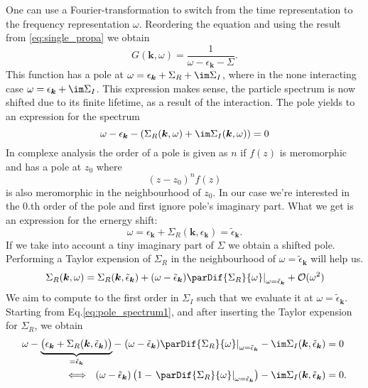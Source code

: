 \documentclass[../main.tex]{subfile}
\begin{document}
One can use a Fourier-transformation to switch from the time representation to the frequency representation $\omega$. Reordering the equation and using the result
from \ref{eq:single_propa} we obtain
\[
    G(\bm{k},\omega) = \frac{1}{\omega - \epsilon_{\bm{k}} - \Sigma}.
\]
This function has a pole at $\omega = \epsilon_{\bm{k}} + \Sigma_R + \im \Sigma_I$, where in the none interacting case $\omega = \epsilon_{\bm{k}} + \im\Sigma_I$.
This expression makes sense, the particle spectrum is now shifted due to its finite lifetime, as a result of the interaction.
The pole yields to an expression for the spectrum
\begin{equation} \label{eq:pole_spectrum1}
    \omega - \epsilon_{\bm{k}} - \left(\Sigma_R(\bm{k},\omega) + \im \Sigma_I(\bm{k},\omega)\right) = 0
\end{equation}
In complexe analysis the order of a pole is given as $n$ if $f(z)$ is meromorphic and has a pole at $z_0$ where
\[
    (z-z_0)^n f(z)
\]
is also meromorphic in the neighbourhood of $z_0$. In our case we're interested in the 0.th order of the pole and first ignore pole's imaginary part. What we get
is an expression for the ernergy shift:
\[
    \omega = \epsilon_{\bm{k}} + \Sigma_R(\bm{k}, \epsilon_{\bm{k}}) = \tilde{\epsilon}_{\bm{k}}.  
\]
If we take into account a tiny imaginary part of $\Sigma$ we obtain a shifted pole. Performing a Taylor expension of 
$\Sigma_{R}$ in the neighbourhood of $\omega = \tilde{\epsilon}_{\bm{k}}$ will help us.
\begin{equation*}
    \left.\Sigma_R(\bm{k}, \omega) = \Sigma_R(\bm{k}, \tilde{\epsilon}_{\bm{k}}) + (\omega - \tilde{\epsilon}_{\bm{k}}) \parDif{\Sigma_R}{\omega}\right|_{\omega= \tilde{\epsilon}_{\bm{k}}} + \mathcal{O}(\omega^2)
\end{equation*}
We aim to compute to the first order in $\Sigma_I$ such that we evaluate it at $\omega = \tilde{\epsilon}_{\bm{k}}$. 
Starting from Eq.\ref{eq:pole_spectrum1}, and after inserting the Taylor expension for $\Sigma_R$, we obtain
\begin{equation}
    \begin{aligned}
        \omega - \underbrace{\bigl(\epsilon_{\bm{k}} + \Sigma_R(\bm{k}, \tilde{\epsilon}_{\bm{k}})\bigr)}_{=  \tilde{\epsilon}_{\bm{k}}} 
        - \left.(\omega - \tilde{\epsilon}_{\bm{k}}) \parDif{\Sigma_R}{\omega}\right|_{\omega= \tilde{\epsilon}_{\bm{k}}} - \im \Sigma_I(\bm{k}, \tilde{\epsilon}_{\bm{k}}) &= 0\\
        \Longleftrightarrow ~~ (\omega - \tilde{\epsilon}_{\bm{k}}) \left(1 - \left.\parDif{\Sigma_R}{\omega}\right|_{\omega= \tilde{\epsilon}_{\bm{k}}}\right) - \im \Sigma_I(\bm{k}, \tilde{\epsilon}_{\bm{k}}) &= 0.
    \end{aligned}
\end{equation}
\end{document}
